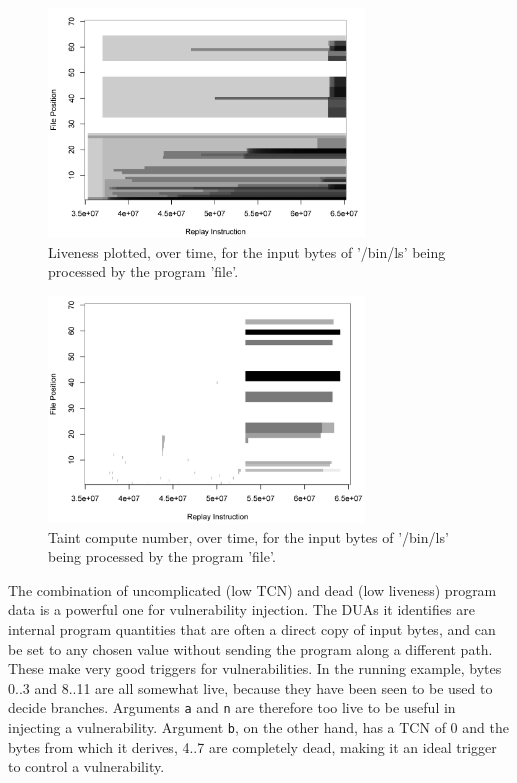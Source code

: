 
\begin{figure}
\centering
\includegraphics[width=3.3in]{liv-graph.png}
\caption{Liveness plotted, over time, for the input bytes of '/bin/ls' being processed by the program 'file'.}
\label{fig:liv-graph}
\end{figure}

\begin{figure}
\centering
\includegraphics*[width=3.3in]{tcn-graph.png}
\caption{Taint compute number, over time, for the input bytes of '/bin/ls' being processed by the program 'file'.}
\label{fig:tcn-graph}
\end{figure}


The combination of uncomplicated (low TCN) and dead (low liveness) program data is a powerful one for vulnerability injection.
The DUAs it identifies are internal program quantities that are often a direct copy of input bytes, and can be set to any chosen value without sending the program along a different path.  
These make very good triggers for vulnerabilities.
In the running example, bytes 0..3 and 8..11 are all somewhat live, because they have been seen to be used to decide branches.
Arguments \verb+a+ and \verb+n+ are therefore too live to be useful in injecting a vulnerability.
Argument \verb+b+, on the other hand, has a TCN of 0 and the bytes from which it derives, 4..7 are completely dead, 
making it an ideal trigger to control a vulnerability. 

